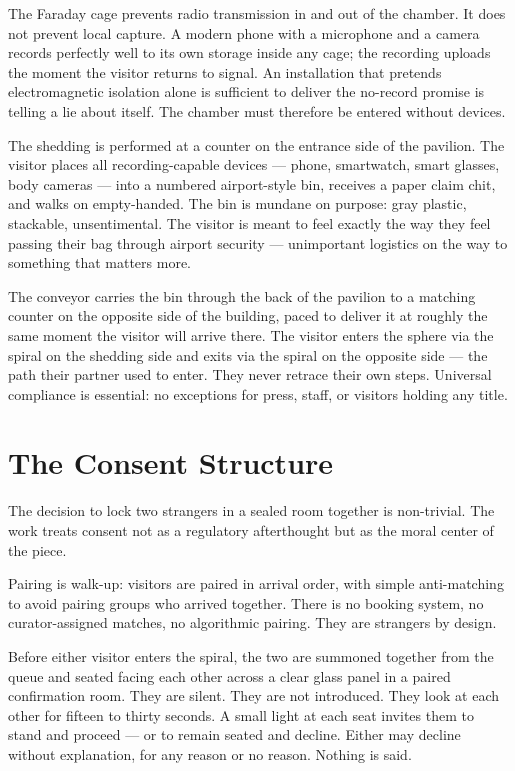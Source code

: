 \documentclass[]{anvil-installation}
\begin{document}
The Faraday cage prevents radio transmission in and out of the chamber. It does not prevent local capture. A modern phone with a microphone and a camera records perfectly well to its own storage inside any cage; the recording uploads the moment the visitor returns to signal. An installation that pretends electromagnetic isolation alone is sufficient to deliver the no-record promise is telling a lie about itself. The chamber must therefore be entered without devices.

The shedding is performed at a counter on the entrance side of the pavilion. The visitor places all recording-capable devices --- phone, smartwatch, smart glasses, body cameras --- into a numbered airport-style bin, receives a paper claim chit, and walks on empty-handed. The bin is mundane on purpose: gray plastic, stackable, unsentimental. The visitor is meant to feel exactly the way they feel passing their bag through airport security --- unimportant logistics on the way to something that matters more.

The conveyor carries the bin through the back of the pavilion to a matching counter on the opposite side of the building, paced to deliver it at roughly the same moment the visitor will arrive there. The visitor enters the sphere via the spiral on the shedding side and exits via the spiral on the opposite side --- the path their partner used to enter. They never retrace their own steps. Universal compliance is essential: no exceptions for press, staff, or visitors holding any title.

\section{The Consent Structure}

The decision to lock two strangers in a sealed room together is non-trivial. The work treats consent not as a regulatory afterthought but as the moral center of the piece.

Pairing is walk-up: visitors are paired in arrival order, with simple anti-matching to avoid pairing groups who arrived together. There is no booking system, no curator-assigned matches, no algorithmic pairing. They are strangers by design.

Before either visitor enters the spiral, the two are summoned together from the queue and seated facing each other across a clear glass panel in a paired confirmation room. They are silent. They are not introduced. They look at each other for fifteen to thirty seconds. A small light at each seat invites them to stand and proceed --- or to remain seated and decline. Either may decline without explanation, for any reason or no reason. Nothing is said.
\end{document}
